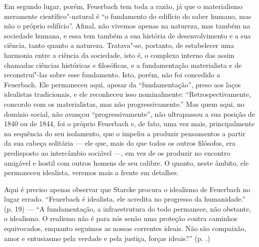 Em segundo lugar,
porém, Feuerbach tem
toda a razão, já que o materialismo meramente científico"-natural é ``o
fundamento do edifício do saber humano, mas não o próprio edifício''.
Afinal, não vivemos apenas na natureza, mas também na sociedade humana,
e essa tem também a sua história de desenvolvimento e a sua ciência,
tanto quanto a natureza. Tratava"-se, portanto, de estabelecer uma
harmonia entre a ciência da sociedade, isto é, o complexo interno
das assim chamadas ciências históricas e filosóficas, 
e a fundamentação materialista e de reconstruí"-las sobre esse
fundamento. Isto, porém, não foi concedido
a Feuerbach.
Ele permaneceu aqui, apesar da ``fundamentação'', preso aos laços
idealistas tradicionais, e ele reconheceu isso nominalmente:
``Retrospectivamente, concordo com os materialistas, mas não
progressivamente.'' Mas quem aqui, no domínio social, não avançou
``progressivamente'', não ultrapassou a sua posição de 1840 ou de 1844,
foi o
próprio Feuerbach e,
de fato, uma vez mais, principalmente na sequência do seu isolamento,
que o impeliu a produzir pensamentos a partir da sua 
cabeça solitária --- ele que, mais do que todos os outros filósofos, era
predisposto ao intercâmbio sociável ---, em vez de os produzir no encontro
amigável e hostil com outros homens de seu calibre. O quanto, neste
âmbito, ele permaneceu idealista, veremos mais a frente em detalhes.

Aqui é preciso apenas observar que Starcke procura o idealismo
de Feuerbach no
lugar errado.
``Feuerbach é
idealista, ele acredita no progresso da humanidade.'' (p. 19) --- ``A
fundamentação, a infraestrutura do todo permanece, 
não obstante, o idealismo. O realismo não é para nós senão uma proteção
contra caminhos equivocados, enquanto seguimos as nossas correntes
ideais. Não são compaixão, amor e entusiasmo pela verdade e pela
justiça, forças ideais?'' (p. .)

